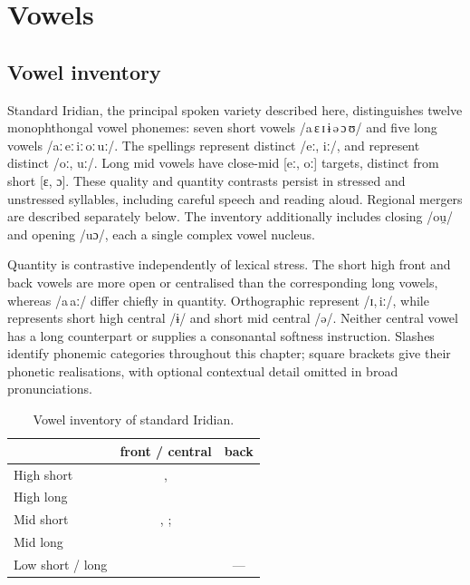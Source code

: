 \section{Vowels}

\subsection{Vowel inventory}

Standard Iridian, the principal spoken variety described here, distinguishes
twelve monophthongal vowel phonemes: seven short
vowels /a\,ɛ\,ɪ\,ɨ\,ə\,ɔ\,ʊ/ and five long vowels /aː\,eː\,iː\,oː\,uː/.
The spellings  represent distinct /eː, iː/, and
 represent distinct /oː, uː/. Long mid vowels have close-mid
[eː, oː] targets, distinct from short [ɛ, ɔ]. These quality and quantity
contrasts persist in stressed and unstressed syllables, including careful
speech and reading aloud. Regional mergers are described separately below.
The inventory additionally includes closing  /ou̯/ and opening
 /uɔ/, each a single complex vowel nucleus.

Quantity is contrastive independently of lexical stress. The short high
front and back vowels are more open or centralised than the corresponding long
vowels, whereas /a\,aː/ differ chiefly in quantity. Orthographic
 represent /ɪ,\,iː/, while  represents short
high central /ɨ/ and  short mid central /ə/. Neither central
vowel has a long counterpart or supplies a consonantal softness instruction.
Slashes identify phonemic
categories throughout this chapter; square brackets give their phonetic
realisations, with optional contextual detail omitted in broad pronunciations.

\begin{table}[ht]
	\footnotesize
	\caption{Vowel inventory of standard Iridian.}\label{tab:vowels}
	\begin{tabularx}{0.9\textwidth}{L C C}
		\toprule
		& {\sc front / central} & {\sc back} \\
		\midrule
		High short &  ,   &   \\
		High long &   &   \\
		Mid short &  , ;   &   \\
		Mid long &   &   \\
		Low short / long &   & --- \\
		\bottomrule
	\end{tabularx}
\end{table}

